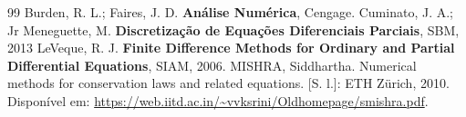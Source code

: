 \documentclass[12pt, a4paper]{article}
\theoremstyle{definition}
\begin{document}
\begin{thebibliography}{99}
	 Burden, R. L.; Faires, J. D. \textbf{Análise Numérica}, Cengage.
	 Cuminato, J. A.; Jr Meneguette, M. \textbf{Discretização de Equações Diferenciais Parciais}, SBM, 2013
	 LeVeque, R. J. \textbf{Finite Difference Methods for Ordinary and Partial Differential Equations}, SIAM, 2006.
	 MISHRA, Siddhartha. Numerical methods for conservation laws and related equations. [S. l.]: ETH Zürich, 2010. Disponível em: \url{https://web.iitd.ac.in/~vvksrini/Oldhomepage/smishra.pdf}.
\end{thebibliography}
\end{document}
